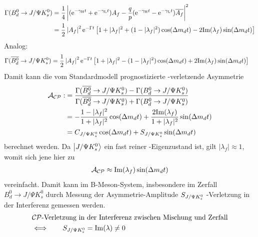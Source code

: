 \begin{align}
\nonumber \Gamma (\text{$B_d^0$} \rightarrow J/\Psi K_s^0) &= \frac{1}{4}\left| (\mathrm{e}^{-\gamma_{\text{H}} t}+\mathrm{e}^{-\gamma_{\text{L}} t})A_f - \frac{q}{p}(\mathrm{e}^{-\gamma_{\text{H}} t}-\mathrm{e}^{-\gamma_{\text{L}} t})\overline{A_f}\right|^2 \\
&= \frac{1}{2} \left|A_f\right|^2\mathrm{e}^{-\Gamma t} \left[1+|\lambda_f|^2 + (1-|\lambda_f|^2)\cos(\Delta m_d t) - 2\mathrm{Im}(\lambda_f)\sin(\Delta m_d t)\right] \label{eq:bd}
\end{align}
Analog:
\begin{align}
\Gamma (\text{$\overline{B_d^0}$} \rightarrow J/\Psi K_s^0) &= \frac{1}{2} \left|A_f\right|^2\mathrm{e}^{-\Gamma t} \left[1+|\lambda_f|^2 -(1-|\lambda_f|^2)\cos(\Delta m_d t) + 2\mathrm{Im}(\lambda_f)\sin(\Delta m_d t)\right] \label{eq:bdbar}
\end{align}
Damit kann die vom Standardmodell prognostizierte \CP-verletzende Asymmetrie 
\begin{align}
\mathcal{A}_{\text{$\mathcal{CP}$}} :&= \frac{\Gamma (\text{$\overline{B_d^0}$} \rightarrow J/\Psi K_s^0) - \Gamma (\text{$B_d^0$} \rightarrow J/\Psi K_s^0)}{\Gamma (\text{$\overline{B_d^0}$} \rightarrow J/\Psi K_s^0) + \Gamma (\text{$B_d^0$} \rightarrow J/\Psi K_s^0)} \label{eq:cp_asymm_def}\\
&= -\frac{1-|\lambda_f|^2}{1+|\lambda_f|^2}\cos(\Delta m_d t) + \frac{2\mathrm{Im}(\lambda_f)}{1+|\lambda_f|^2}\sin(\Delta m_d t) \\
&= C_{J/\Psi K_s^0} \cos(\Delta m_d t) + S_{J/\Psi K_s^0} \sin(\Delta m_d t) \label{eq:cp_asymm}
\end{align}
berechnet werden. Da $\Ket{J/\Psi K_s^0}$ ein fast reiner \CP-Eigenzustand ist, gilt $|\lambda_f| \approx 1$, womit sich jene hier zu
\begin{align}
\mathcal{A}_{\text{$\mathcal{CP}$}} \approx \mathrm{Im}(\lambda_f)\sin(\Delta m_d t)
\end{align}
vereinfacht. Damit kann im B-Meson-System, insbesondere im Zerfall $B_d^0 \rightarrow J/\Psi K_s^0$ durch Messung der Asymmetrie-Amplitude $S_{J/\Psi K_s^0}$ \CP-Verletzung in der Interferenz gemessen werden.
\begin{align}
\nonumber &\text{$\mathcal{CP}$-Verletzung in der Interferenz zwischen Mischung und Zerfall} \\ &\Longleftrightarrow \qquad S_{J/\Psi K_s^0} = \mathrm{Im}(\lambda)\neq 0
\end{align}

